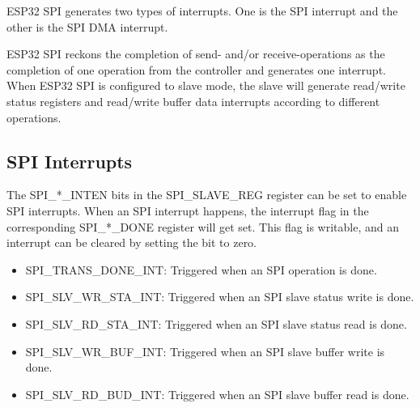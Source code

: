 \documentclass[main\_\_EN.tex]{subfiles}
\begin{document}
ESP32 SPI generates two types of interrupts. One is the SPI interrupt and the other is the SPI DMA interrupt.

ESP32 SPI reckons the completion of send- and/or receive-operations as the completion of one operation from the controller and generates one interrupt. When ESP32 SPI is configured to slave mode, the slave will generate read/write status registers and read/write buffer data interrupts according to different operations.

\subsection{SPI Interrupts}
The SPI\_*\_INTEN bits in the SPI\_SLAVE\_REG register can be set to enable SPI interrupts. When an SPI interrupt happens, the interrupt flag in the corresponding SPI\_*\_DONE register will get set. This flag is writable, and an interrupt can be cleared by setting the bit to zero.

\begin{itemize}
\item \label{int:SPITRANSDONEINT}SPI\_TRANS\_DONE\_INT: Triggered when an SPI operation is done.
\item \label{int:SPISLVWRSTAINT}SPI\_SLV\_WR\_STA\_INT: Triggered when an SPI slave status write is done.
\item \label{int:SPISLVRDSTAINT}SPI\_SLV\_RD\_STA\_INT: Triggered when an SPI slave status read is done.
\item \label{int:SPISLVWRBUFINT}SPI\_SLV\_WR\_BUF\_INT: Triggered when an SPI slave buffer write is done.
\item \label{int:SPISLVRDBUFINT}SPI\_SLV\_RD\_BUD\_INT: Triggered when an SPI slave buffer read is done.
\end{itemize}
\end{document}
